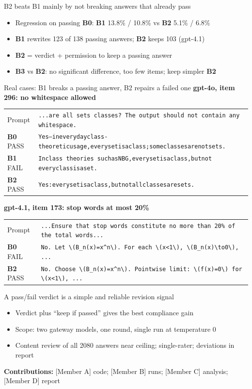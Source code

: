 \documentclass[aspectratio=169,11pt]{beamer}
\newcommand{\Bz}{\textcolor{okBlue}{\textbf{B0}}}
\newcommand{\Bo}{\textcolor{okOrange}{\textbf{B1}}}
\newcommand{\Bt}{\textcolor{okGreen}{\textbf{B2}}}
\newcommand{\Bh}{\textcolor{okPink}{\textbf{B3}}}
\begin{document}
\begin{frame}{B2 beats B1 mainly by not breaking answers that already pass}
  \begin{itemize}
    \item Regression on passing \Bz: \Bo{} 13.8\% / 10.8\% vs \Bt{} 5.1\% / 6.8\%
    \item \Bo{} rewrites 123 of 138 passing answers; \Bt{} keeps 103 (gpt-4.1)
    \item \Bt{} = verdict + permission to keep a passing answer
    \item \Bh{} vs \Bt: no significant difference, too few items; keep simpler \Bt
  \end{itemize}
\end{frame}

\begin{frame}[fragile]{Real cases: B1 breaks a passing answer, B2 repairs a failed one}
  \textbf{gpt-4o, item 296: no whitespace allowed}\par\smallskip
  \begin{tabular}{@{}ll@{}}
    Prompt & \lstinline!...are all sets classes? The output should not contain any whitespace.! \\
    \Bz{} PASS & \lstinline!Yes—ineverydayclass-theoreticusage,everysetisaclass;someclassesarenotsets.! \\
    \Bo{} FAIL & \lstinline!Inclass theories suchasNBG,everysetisaclass,butnot everyclassisaset.! \\
    \Bt{} PASS & \lstinline!Yes:everysetisaclass,butnotallclassesaresets.! \\
  \end{tabular}
  \vspace{1.2em}

  \textbf{gpt-4.1, item 173: stop words at most 20\%}\par\smallskip
  \begin{tabular}{@{}ll@{}}
    Prompt & \lstinline!...Ensure that stop words constitute no more than 20% of the total words...! \\
    \Bz{} FAIL & \lstinline!No. Let \(B_n(x)=x^n\). For each \(x<1\), \(B_n(x)\to0\), ...! \\
    \Bt{} PASS & \lstinline!No. Choose \(B_n(x)=x^n\). Pointwise limit: \(f(x)=0\) for \(x<1\), ...! \\
  \end{tabular}
\end{frame}

\begin{frame}{A pass/fail verdict is a simple and reliable revision signal}
  \begin{itemize}
    \item Verdict plus ``keep if passed'' gives the best compliance gain
    \item Scope: two gateway models, one round, single run at temperature 0
    \item Content review of all 2080 answers near ceiling; single-rater; deviations in report
  \end{itemize}
  \vspace{1.2em}
  \textbf{Contributions:} [Member A] code; [Member B] runs; [Member C] analysis; [Member D] report
\end{frame}
\end{document}

